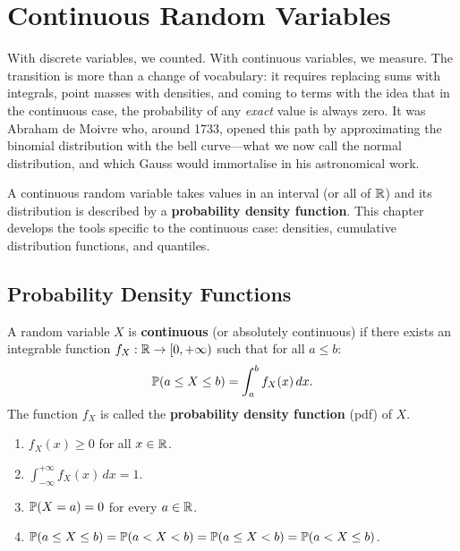 \chapter{Continuous Random Variables}
\label{ch:continuous}

With discrete variables, we counted. With continuous variables, we measure. The transition is more than a change of vocabulary: it requires replacing sums with integrals, point masses with densities, and coming to terms with the idea that in the continuous case, the probability of any \emph{exact} value is always zero. It was Abraham de Moivre who, around 1733, opened this path by approximating the binomial distribution with the bell curve---what we now call the normal distribution, and which Gauss would immortalise in his astronomical work.

\begin{intuition}
A continuous random variable takes values in an interval (or all of $\mathbb{R}$) and its
distribution is described by a \textbf{probability density function}. This chapter
develops the tools specific to the continuous case: densities, cumulative
distribution functions, and quantiles.
\end{intuition}

\section{Probability Density Functions}

\begin{definition}
A random variable $X$ is \textbf{continuous} (or absolutely continuous) if there
exists an integrable function $f_X : \mathbb{R} \to [0, +\infty)$ such that for all $a \leq b$:
\[
    \mathbb{P}(a \leq X \leq b) = \int_a^b f_X(x)\, dx.
\]
The function $f_X$ is called the \textbf{probability density function} (pdf) of $X$.
\end{definition}

\begin{proposition}
\begin{enumerate}[label=(\roman*)]
    \item $f_X(x) \geq 0$ for all $x \in \mathbb{R}$.
    \item $\int_{-\infty}^{+\infty} f_X(x)\, dx = 1$.
    \item $\mathbb{P}(X = a) = 0$ for every $a \in \mathbb{R}$.
    \item $\mathbb{P}(a \leq X \leq b) = \mathbb{P}(a < X < b) = \mathbb{P}(a \leq X < b) = \mathbb{P}(a < X \leq b)$.
\end{enumerate}
\end{proposition}

